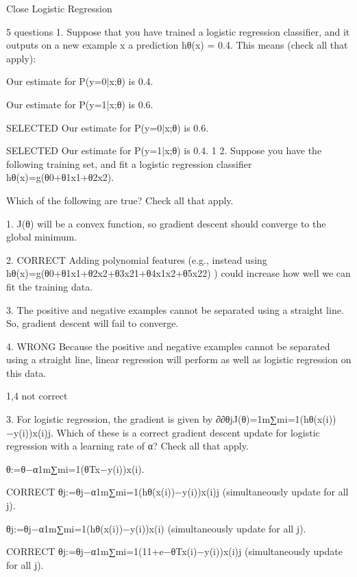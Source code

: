 Close
Logistic Regression

5 questions
1. 
Suppose that you have trained a logistic regression classifier, and it outputs on a new example x a prediction hθ(x) = 0.4. This means (check all that apply):

Our estimate for P(y=0|x;θ) is 0.4.

Our estimate for P(y=1|x;θ) is 0.6.

SELECTED Our estimate for P(y=0|x;θ) is 0.6.

SELECTED Our estimate for P(y=1|x;θ) is 0.4.
1
2. 
Suppose you have the following training set, and fit a logistic regression classifier hθ(x)=g(θ0+θ1x1+θ2x2).



Which of the following are true? Check all that apply.

1.  J(θ) will be a convex function, so gradient descent should converge to the global minimum.

2. CORRECT Adding polynomial features (e.g., instead using hθ(x)=g(θ0+θ1x1+θ2x2+θ3x21+θ4x1x2+θ5x22) ) could increase how well we can fit the training data.

3. The positive and negative examples cannot be separated using a straight line. So, gradient descent will fail to converge.

4. WRONG Because the positive and negative examples cannot be separated using a straight line, linear regression will perform as well as logistic regression on this data.


1,4 not correct

3. 
For logistic regression, the gradient is given by ∂∂θjJ(θ)=1m∑mi=1(hθ(x(i))−y(i))x(i)j. Which of these is a correct gradient descent update for logistic regression with a learning rate of α? Check all that apply.



θ:=θ−α1m∑mi=1(θTx−y(i))x(i).


CORRECT θj:=θj−α1m∑mi=1(hθ(x(i))−y(i))x(i)j (simultaneously update for all j).
 
θj:=θj−α1m∑mi=1(hθ(x(i))−y(i))x(i) (simultaneously update for all j).

CORRECT θj:=θj−α1m∑mi=1(11+e−θTx(i)−y(i))x(i)j (simultaneously update for all j).


